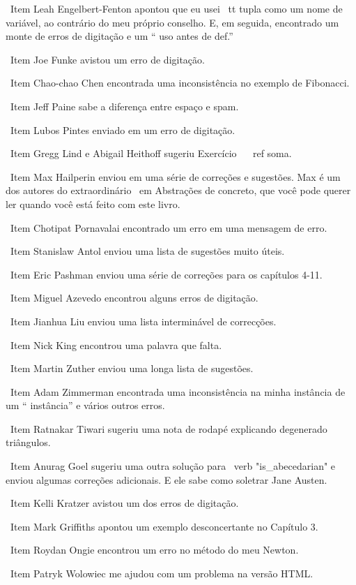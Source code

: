 \documentclass[10pt]{book}
\begin{document}
\ Item Leah Engelbert-Fenton apontou que eu usei {\ tt tupla}
como um nome de variável, ao contrário do meu próprio conselho. E, em seguida, encontrado
um monte de erros de digitação e um `` uso antes de def.''

\ Item Joe Funke avistou um erro de digitação.

\ Item Chao-chao Chen encontrada uma inconsistência no exemplo de Fibonacci.

\ Item Jeff Paine sabe a diferença entre espaço e spam.

\ Item Lubos Pintes enviado em um erro de digitação.

\ Item Gregg Lind e Abigail Heithoff sugeriu Exercício ~ \ ref {soma}.

\ Item Max Hailperin enviou em uma série de correções e
  sugestões. Max é um dos autores do extraordinário {\ em
    Abstrações de concreto}, que você pode querer ler quando você está
  feito com este livro.

\ Item Chotipat Pornavalai encontrado um erro em uma mensagem de erro.

\ Item Stanislaw Antol enviou uma lista de sugestões muito úteis.

\ Item Eric Pashman enviou uma série de correções para os capítulos 4-11.

\ Item Miguel Azevedo encontrou alguns erros de digitação.

\ Item Jianhua Liu enviou uma lista interminável de correcções.

\ Item Nick King encontrou uma palavra que falta.

\ Item Martin Zuther enviou uma longa lista de sugestões.

\ Item Adam Zimmerman encontrada uma inconsistência na minha instância
de um `` instância'' e vários outros erros.

\ Item Ratnakar Tiwari sugeriu uma nota de rodapé explicando degenerado
triângulos.

\ Item Anurag Goel sugeriu uma outra solução para \ verb "is_abecedarian"
e enviou algumas correções adicionais. E ele sabe como
soletrar Jane Austen.

\ Item Kelli Kratzer avistou um dos erros de digitação.

\ Item Mark Griffiths apontou um exemplo desconcertante no Capítulo 3.

\ Item Roydan Ongie encontrou um erro no método do meu Newton.

\ Item Patryk Wolowiec me ajudou com um problema na versão HTML.
\end{document}
